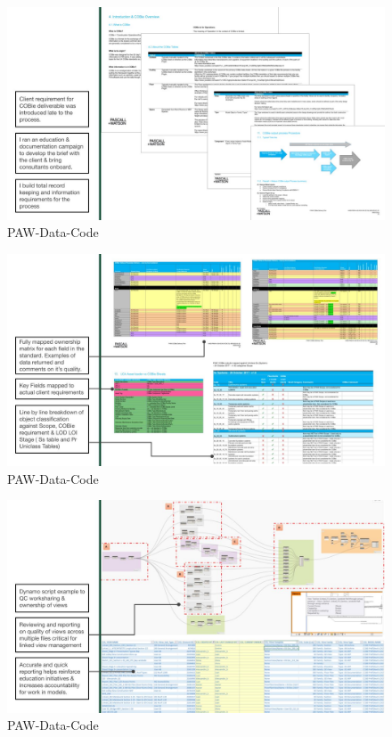 \documentclass[
]{article}
\begin{document}
\begin{figure}[H]

{\centering \includegraphics{assets/PAW/2020-Portfolio-Google-Slides-data.jpg}

}

\caption{PAW-Data-Code}

\end{figure}%
\begin{figure}[H]

{\centering \includegraphics{assets/PAW/2020-Portfolio-Google-Slides-data2.jpg}

}

\caption{PAW-Data-Code}

\end{figure}%
\begin{figure}[H]

{\centering \includegraphics{assets/PAW/2020-Portfolio-Google-Slides-dynamo1.jpg}

}

\caption{PAW-Data-Code}

\end{figure}%
\end{document}
